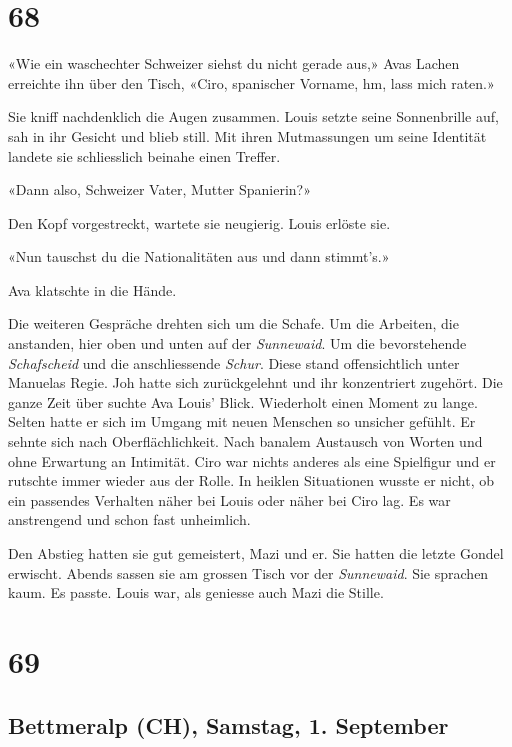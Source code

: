 \chapter{68}




«Wie ein waschechter Schweizer siehst du nicht gerade aus,» Avas Lachen erreichte ihn 
über den Tisch, «Ciro, spanischer Vorname, hm, lass mich raten.»

Sie kniff nachdenklich die Augen zusammen. 
Louis setzte seine Sonnenbrille auf, sah in ihr Gesicht und blieb still.
Mit ihren Mutmassungen um seine Identität landete sie schliesslich
beinahe einen Treffer.

«Dann also, Schweizer Vater, Mutter Spanierin?»

Den Kopf vorgestreckt, wartete sie neugierig. Louis erlöste sie.

«Nun tauschst du die Nationalitäten aus und dann stimmt’s.»

Ava klatschte in die Hände.

Die weiteren Gespräche drehten sich um die Schafe. Um die Arbeiten, die
anstanden, hier oben und unten auf der \emph{Sunnewaid}. Um die
bevorstehende \emph{Schafscheid} und die anschliessende \emph{Schur}.
Diese stand offensichtlich unter Manuelas Regie. Joh hatte sich
zurückgelehnt und ihr konzentriert zugehört. 
Die ganze Zeit über suchte Ava Louis’ Blick. Wiederholt einen Moment zu
lange. Selten hatte er sich im Umgang mit neuen Menschen so unsicher gefühlt.
Er sehnte sich nach Oberflächlichkeit. Nach banalem Austausch von Worten und ohne
Erwartung an Intimität. Ciro war nichts anderes als eine Spielfigur und er rutschte immer
wieder aus der Rolle. In heiklen Situationen wusste er nicht, ob ein
passendes Verhalten näher bei Louis oder näher bei Ciro lag. Es war anstrengend und schon fast unheimlich.

\sectionbreak

Den Abstieg hatten sie gut gemeistert, Mazi und er. Sie hatten die letzte Gondel erwischt. Abends sassen sie am grossen Tisch vor der \emph{Sunnewaid}. Sie sprachen kaum. Es passte.
Louis war, als geniesse auch Mazi die Stille.

\chapter{69} 

\section{Bettmeralp (CH), Samstag, 1.
September}

